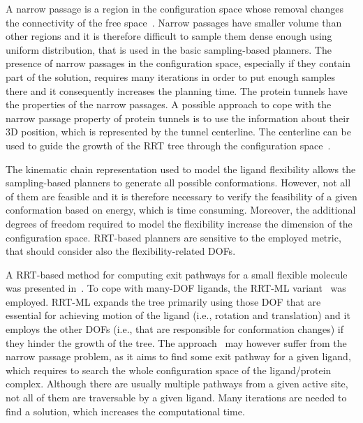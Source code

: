 \documentclass{svmult}
\begin{document}
A narrow passage is a region in the configuration space whose removal changes the connectivity of the free space~\cite{hannaWIS}.
Narrow passages have smaller volume than other regions and it is therefore difficult to sample them dense enough using uniform distribution, that is used in the basic sampling-based planners.
The presence of narrow passages in the configuration space, especially if they contain part of the solution, requires many iterations
in order to put enough samples there and it consequently increases the planning time.
The protein tunnels have the properties of the narrow passages. 
A possible approach to cope with the narrow passage property of protein tunnels is to use the information
about their 3D position, which is represented by the tunnel centerline.
The centerline can be used to guide the growth of the RRT tree through the configuration space~\cite{vonasek2009rrt,denny2016dynamic}.

The kinematic chain representation used to model the ligand flexibility allows the sampling-based planners to generate all possible conformations.
However, not all of them are feasible and it is therefore necessary to verify the feasibility of a given conformation based on energy, which is time consuming.
Moreover, the additional degrees of freedom required to model the flexibility increase the dimension of the configuration space.
RRT-based planners are sensitive to the employed metric, that should consider also the flexibility-related DOFs.

A RRT-based method for computing exit pathways for a small flexible molecule was presented in~\cite{cortes2010simulating}.
To cope with many-DOF ligands, the RRT-ML variant~\cite{cortes2007mlrrt} was employed.
RRT-ML expands the tree primarily using those DOF that are essential for achieving motion of the ligand (i.e., rotation
and translation) and it employs the other DOFs (i.e., that are responsible for conformation changes) if they hinder the growth of the tree.
The approach~\cite{cortes2010simulating} may however suffer from the narrow passage problem, as it aims to find some exit pathway for a given ligand, which requires to search the whole configuration space of the ligand/protein complex.
Although there are usually multiple pathways from a given active site, not all of them are traversable by a given ligand.
Many iterations are needed to find a solution, which increases the computational time.
\end{document}

